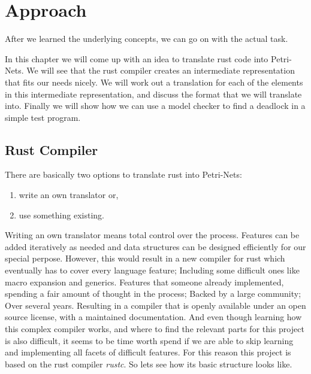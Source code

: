 

\chapter{Approach}
After we learned the underlying concepts, we can go on with the actual task.

In this chapter we will come up with an idea to translate rust code into Petri-Nets.
We will see that the rust compiler creates an intermediate representation that fits our needs nicely.
We will work out a translation for each of the elements in this intermediate representation, and discuss the format that we will translate into.
Finally we will show how we can use a model checker to find a deadlock in a simple test program.

\section{Rust Compiler}
\label{app_rust}
There are basically two options to translate rust into Petri-Nets:
\begin{enumerate}
    \item write an own translator or,
    \item use something existing.
\end{enumerate}
Writing an own translator means total control over the process.
Features can be added iteratively as needed and data structures can be designed efficiently for our special perpose.
However, this would result in a new compiler for rust which eventually has to cover every language feature;
Including some difficult ones like macro expansion and generics.
Features that someone already implemented, spending a fair amount of thought in the process;
Backed by a large community;
Over several years.
Resulting in a compiler that is openly available under an open source license\cite{rustc}, with a maintained documentation\cite{rustc-guide}\cite{rustc-doc}.
And even though learning how this complex compiler works, and where to find the relevant parts for this project is also difficult, it seems to be time worth spend if we are able to skip learning and implementing all facets of difficult features.
For this reason this project is based on the rust compiler \textit{rustc}.
So lets see how its basic structure looks like.

